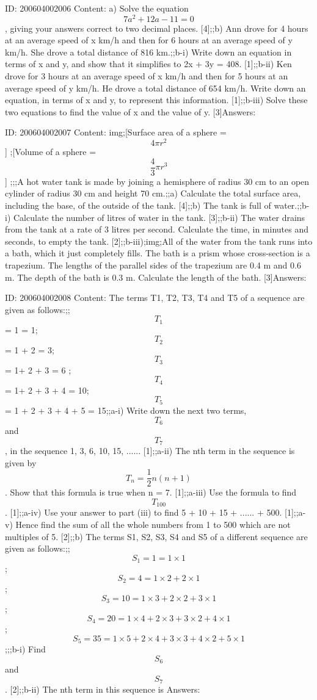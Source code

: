 \documentclass{article}
\begin{document}
ID: 200604002006
Content:
a) Solve the equation $$7a^{2} +12a-11=0$$, giving your answers correct to two decimal places. [4];;b) Ann drove for 4 hours at an average speed of x km/h and then for 6 hours at an average speed of y km/h. She drove a total distance of 816 km.;;b-i) Write down an equation in terms of x and y, and show that it simplifies to 2x + 3y = 408. [1];;b-ii) Ken drove for 3 hours at an average speed of x km/h and then for 5 hours at an average speed of y km/h. He drove a total distance of 654 km/h. Write down an equation, in terms of x and y, to represent this information. [1];;b-iii) Solve these two equations to find the value of x and the value of y. [3]Answers:

ID: 200604002007
Content:
img;[Surface area of a sphere = $$4\pi r^{2} $$] ;[Volume of a sphere = $$\frac{4}{3} \pi r^{3} $$] ;;;A hot water tank is made by joining a hemisphere of radius 30 cm to an open cylinder of radius 30 cm and height 70 cm.;;a) Calculate the total surface area, including the base, of the outside of the tank. [4];;b) The tank is full of water.;;b-i) Calculate the number of litres of water in the tank. [3];;b-ii) The water drains from the tank at a rate of 3 litres per second. Calculate the time, in minutes and seconds, to empty the tank. [2];;b-iii);img;All of the water from the tank runs into a bath, which it just completely fills. The bath is a prism whose cross-section is a trapezium. The lengths of the parallel sides of the trapezium are 0.4 m and 0.6 m. The depth of the bath is 0.3 m. Calculate the length of the bath. [3]Answers:

ID: 200604002008
Content:
The terms T1, T2, T3, T4 and T5 of a sequence are given as follows:;;$$T_{1}$$ = 1 = 1;$$T_{2}$$= 1 + 2 = 3;$$T_{3}$$ = 1+ 2 + 3 = 6 ;$$T_{4}$$ = 1+ 2 + 3 + 4 = 10;$$T_{5}$$ = 1 + 2 + 3 + 4 + 5 = 15;;a-i) Write down the next two terms, $$ T_{6}$$ and $$ T_{7}$$, in the sequence 1, 3, 6, 10, 15, ...... [1];;a-ii) The nth term in the sequence is given by $$T_{n} =\frac{1}{2}n(n+1)$$. Show that this formula is true when n = 7. [1];;a-iii) Use the formula to find $$T_{100} $$. [1];;a-iv) Use your answer to part (iii) to find 5 + 10 + 15 + ...... + 500. [1];;a-v) Hence find the sum of all the whole numbers from 1 to 500 which are not multiples of 5. [2];;b) The terms S1, S2, S3, S4 and S5 of a different sequence are given as follows:;;$$S_{1}=1=1 \times 1$$;$$ S_{2}=4=1 \times 2+2 \times 1$$;$$S_{3}=10=1 \times 3+2 \times 2+3 \times 1$$;$$S_{4}=20=1 \times 4+2 \times 3+3 \times 2+4 \times 1$$;$$S_{5}=35=1 \times 5+2 \times 4+3 \times 3+4 \times 2+5 \times 1$$;;;b-i) Find $$ S_{6}$$ and $$ S_{7}$$. [2];;b-ii) The nth term in this sequence is Answers:
\end{document}
